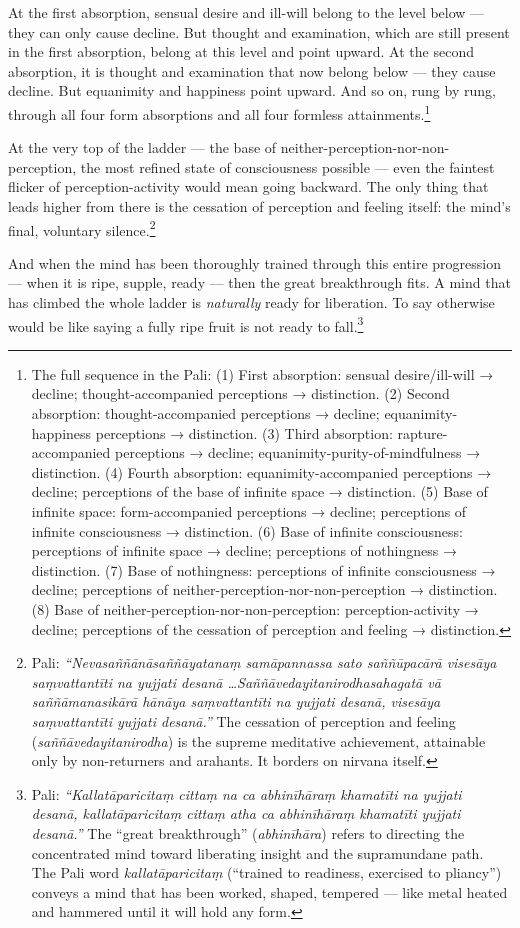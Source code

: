 At the first absorption, sensual desire and ill-will belong to the level below --- they can only cause decline. But thought and examination, which are still present in the first absorption, belong at this level and point upward. At the second absorption, it is thought and examination that now belong below --- they cause decline. But equanimity and happiness point upward. And so on, rung by rung, through all four form absorptions and all four formless attainments.\footnote{The full sequence in the Pali: (1) First absorption: sensual desire/ill-will → decline; thought-accompanied perceptions → distinction. (2) Second absorption: thought-accompanied perceptions → decline; equanimity-happiness perceptions → distinction. (3) Third absorption: rapture-accompanied perceptions → decline; equanimity-purity-of-mindfulness → distinction. (4) Fourth absorption: equanimity-accompanied perceptions → decline; perceptions of the base of infinite space → distinction. (5) Base of infinite space: form-accompanied perceptions → decline; perceptions of infinite consciousness → distinction. (6) Base of infinite consciousness: perceptions of infinite space → decline; perceptions of nothingness → distinction. (7) Base of nothingness: perceptions of infinite consciousness → decline; perceptions of neither-perception-nor-non-perception → distinction. (8) Base of neither-perception-nor-non-perception: perception-activity → decline; perceptions of the cessation of perception and feeling → distinction.}

At the very top of the ladder --- the base of neither-perception-nor-non-perception, the most refined state of consciousness possible --- even the faintest flicker of perception-activity would mean going backward. The only thing that leads higher from there is the cessation of perception and feeling itself: the mind's final, voluntary silence.\footnote{Pali: \textit{``Nevasaññānāsaññāyatanaṃ samāpannassa sato saññūpacārā visesāya saṃvattantīti na yujjati desanā \ldots Saññāvedayitanirodhasahagatā vā saññāmanasikārā hānāya saṃvattantīti na yujjati desanā, visesāya saṃvattantīti yujjati desanā.''} The cessation of perception and feeling (\textit{saññāvedayitanirodha}) is the supreme meditative achievement, attainable only by non-returners and arahants. It borders on nirvana itself.}

And when the mind has been thoroughly trained through this entire progression --- when it is ripe, supple, ready --- then the great breakthrough fits. A mind that has climbed the whole ladder is \textit{naturally} ready for liberation. To say otherwise would be like saying a fully ripe fruit is not ready to fall.\footnote{Pali: \textit{``Kallatāparicitaṃ cittaṃ na ca abhinīhāraṃ khamatīti na yujjati desanā, kallatāparicitaṃ cittaṃ atha ca abhinīhāraṃ khamatīti yujjati desanā.''} The ``great breakthrough'' (\textit{abhinīhāra}) refers to directing the concentrated mind toward liberating insight and the supramundane path. The Pali word \textit{kallatāparicitaṃ} (``trained to readiness, exercised to pliancy'') conveys a mind that has been worked, shaped, tempered --- like metal heated and hammered until it will hold any form.}

